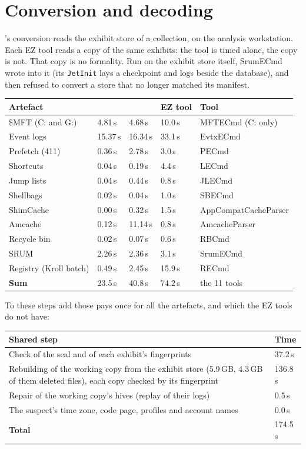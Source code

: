 \documentclass[11pt,a4paper,oneside]{report}
\begin{document}
\section{Conversion and decoding}

\wac{}'s conversion reads the exhibit store of a collection, on the analysis
workstation. Each EZ tool reads a copy of the same exhibits: the tool is timed
alone, the copy is not. That copy is no formality. Run on the exhibit store
itself, SrumECmd wrote into it (its \texttt{JetInit} lays a checkpoint and logs
beside the database), and \wac{} then refused to convert a store that no longer
matched its manifest.

\begin{longtable}{@{}L{4.0cm}L{2.1cm}L{2.5cm}L{2.1cm}L{3.8cm}@{}}
\toprule
\textbf{Artefact} & \textbf{\wac{}} & \textbf{\wac{} } & \textbf{EZ tool} & \textbf{Tool} \\
\midrule\endhead
\$MFT (C: and G:) & 4.81\,s & 4.68\,s & 10.0\,s & MFTECmd (C: only) \\
Event logs & 15.37\,s & 16.34\,s & 33.1\,s & EvtxECmd \\
Prefetch (411) & 0.36\,s & 2.78\,s & 3.0\,s & PECmd \\
Shortcuts & 0.04\,s & 0.19\,s & 4.4\,s & LECmd \\
Jump lists & 0.04\,s & 0.44\,s & 0.8\,s & JLECmd \\
Shellbags & 0.02\,s & 0.04\,s & 1.0\,s & SBECmd \\
ShimCache & 0.00\,s & 0.32\,s & 1.5\,s & AppCompat\-Cache\-Parser \\
Amcache & 0.12\,s & 11.14\,s & 0.8\,s & AmcacheParser \\
Recycle bin & 0.02\,s & 0.07\,s & 0.6\,s & RBCmd \\
SRUM & 2.26\,s & 2.36\,s & 3.1\,s & SrumECmd \\
Registry (Kroll batch) & 0.49\,s & 2.45\,s & 15.9\,s & RECmd \\
\midrule
\textbf{Sum} & 23.5\,s & 40.8\,s & 74.2\,s & the 11 tools \\
\bottomrule
\end{longtable}

To these steps add those \wac{} pays once for all the artefacts, and which the
EZ tools do not have:

\begin{longtable}{@{}L{11.0cm}L{4.0cm}@{}}
\toprule
\textbf{Shared \wac{} step} & \textbf{Time} \\
\midrule\endhead
Check of the seal and of each exhibit's fingerprints & 37.2\,s \\
Rebuilding of the working copy from the exhibit store (5.9\,GB, 4.3\,GB of
  them deleted files), each copy checked by its fingerprint & 136.8\,s \\
Repair of the working copy's hives (replay of their logs) & 0.5\,s \\
The suspect's time zone, code page, profiles and account names & 0.0\,s \\
\midrule
\textbf{Total} & 174.5\,s \\
\bottomrule
\end{longtable}
\end{document}

